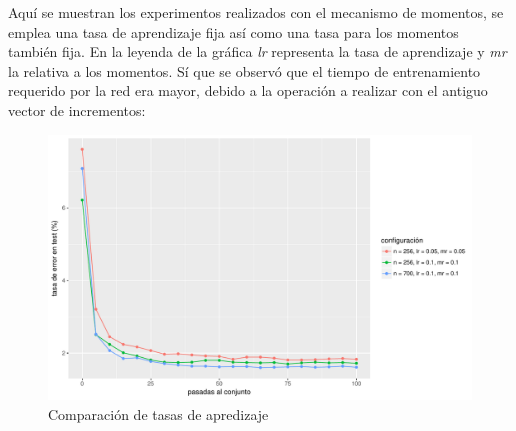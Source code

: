 \documentclass[10pt,a4paper]{article}
\begin{document}
Aquí se muestran los experimentos realizados con el mecanismo de momentos, se emplea una tasa de aprendizaje fija así como una tasa para los momentos también fija. En la leyenda de la gráfica \textit{lr} representa la tasa de aprendizaje y \textit{mr} la relativa a los momentos. Sí que se observó que el tiempo de entrenamiento requerido por la red era mayor, debido a la operación a realizar con el antiguo vector de incrementos:

\begin{figure}[H]
\includegraphics[scale=0.6]{img/momentos.pdf}
\caption{Comparación de tasas de apredizaje}
\end{figure}
\end{document}
